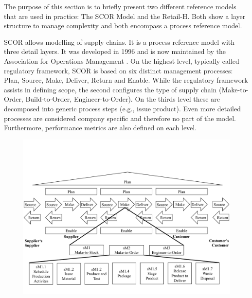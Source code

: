 		The purpose of this section is to briefly present two different reference models that are used in practice: The \acrfull{SCOR} Model and the Retail-H. Both show a layer structure to manage complexity and both encompass a process reference model. 
		
		\acrshort{SCOR} allows modelling of supply chains. It is a process reference model with three detail layers. It was developed in 1996 and is now maintained by the Association for Operations Management \cite{APICS2015}. On the highest level, typically called regulatory framework, \acrshort{SCOR}  is based on six distinct management processes: Plan, Source, Make, Deliver, Return and Enable. While the regulatory framework assists in defining scope, the second configures the type of supply chain (Make-to-Order, Build-to-Order, Engineer-to-Order). On the thirds level these are decomposed into generic process steps (e.g., issue product). Even more detailed processes are considered company specific and therefore no part of the model. Furthermore, performance metrics are also defined on each level. 

		\begin{figure}[caption={SCOR Model}, label={fig:scor}]
		{	\includegraphics[width=.8\textwidth]{figures/scor.pdf}}
		\end{figure}
	

